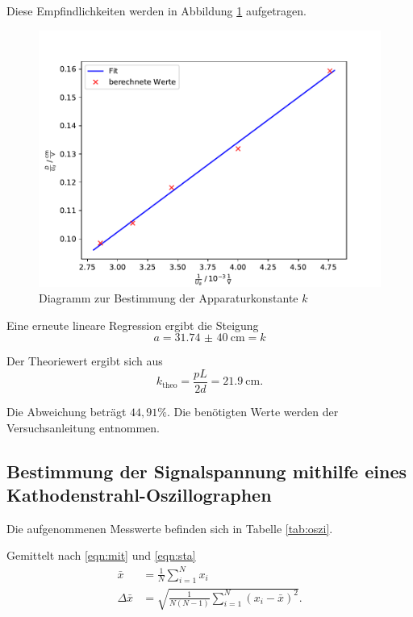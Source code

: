 \newpage
Diese Empfindlichkeiten werden in Abbildung \ref{fig:konst} aufgetragen.
\begin{figure}[H]
  \centering
  \includegraphics[width=\textwidth]{Plots/konst.pdf}
  \caption{Diagramm zur Bestimmung der Apparaturkonstante $k$}
  \label{fig:konst}
\end{figure}

Eine erneute lineare Regression ergibt die Steigung
\begin{equation*}
  a = \SI{31,74(40)}{\cm} = k
\end{equation*}

Der Theoriewert ergibt sich aus
\begin{equation}
  k_\text{theo} = \frac{p L}{2 d} = \SI{21,9}{\cm}.
\end{equation}

Die Abweichung beträgt $44,91 \%$. Die benötigten Werte werden der Versuchsanleitung entnommen.

\newpage

\subsection{Bestimmung der Signalspannung mithilfe eines Kathodenstrahl-Oszillographen}

Die aufgenommenen Messwerte befinden sich in Tabelle \ref{tab:oszi}.


Gemittelt nach \eqref{eqn:mit} und \eqref{eqn:sta}
\begin{align}
  \bar{x} &= \frac{1}{N} \sum_{i=1}^{N} x_i
  \label{eqn:mit} \\
  \Delta \bar{x} &= \sqrt{\frac{1}{N (N - 1)} \sum_{i=1}^{N} (x_i - \bar{x})^2}.
  \label{eqn:sta}
\end{align}


